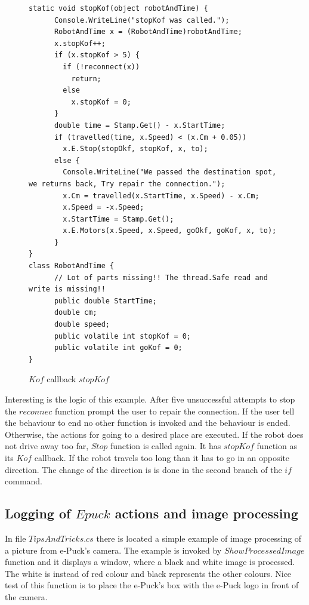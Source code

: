 \documentclass[12pt,notitlepage]{report}
\begin{document}
\begin{figure}[!hbp]
\begin{lstlisting}
static void stopKof(object robotAndTime) {
      Console.WriteLine("stopKof was called.");
      RobotAndTime x = (RobotAndTime)robotAndTime;
      x.stopKof++;
      if (x.stopKof > 5) {
        if (!reconnect(x))
          return;
        else
          x.stopKof = 0;
      }
      double time = Stamp.Get() - x.StartTime;
      if (travelled(time, x.Speed) < (x.Cm + 0.05))
        x.E.Stop(stopOkf, stopKof, x, to);
      else {
        Console.WriteLine("We passed the destination spot, we returns back, Try repair the connection.");
        x.Cm = travelled(x.StartTime, x.Speed) - x.Cm;
        x.Speed = -x.Speed;
        x.StartTime = Stamp.Get();
        x.E.Motors(x.Speed, x.Speed, goOkf, goKof, x, to);
      }
}
class RobotAndTime {
      // Lot of parts missing!! The thread.Safe read and write is missing!!
      public double StartTime;
      double cm;
      double speed;
      public volatile int stopKof = 0;
      public volatile int goKof = 0;
}

\end{lstlisting}
\caption{$Kof$ callback $stopKof$} \label{stopKof}
\end{figure}
	Interesting is the logic of this example. After five unsuccessful attempts to stop the $reconnec$ function
	prompt the user to repair the connection. 
	If the user tell the behaviour to end no other function is invoked and the behaviour is ended.
	Otherwise, the actions for going to a desired place are executed.
	If the robot does not drive away too far, $Stop$ function is called again.
	It has $stopKof$ function as its $Kof$ callback.
	If the robot travels too long than it has to go in an opposite direction.
	The change of the direction is is done in the second branch of the $if$ command.


\subsection{Logging of $Epuck$ actions and image processing}\label{sec:logging}
	In file $TipsAndTricks.cs$ there is located a simple example of image processing 
	of a picture from e-Puck's camera.
	The example is invoked by $ShowProcessedImage$ function and it displays a window, 
	where a black and white image is processed.
	The white is instead of red colour and black represents the other colours. Nice test of this function is to place
	the e-Puck's box with the e-Puck logo in front of the camera. 
\end{document}
